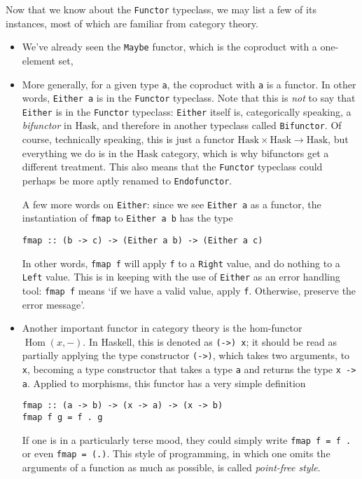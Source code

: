 \documentclass[11	pt]{article}
\theoremstyle{nonumberplain}
\newcommand{\Hask}{\mathrm{Hask}}
\newcommand{\blank}{{-}}
\DeclareMathOperator{\Hom}{Hom}
\newcommand*\lsin{\lstinline}
\begin{document}
Now that we know about the \lsin|Functor| typeclass, we may list a few of its instances, most of which are familiar from category theory.
\begin{itemize}
\item We've already seen the \lsin|Maybe| functor, which is the coproduct with a one-element set,
\item More generally, for a given type \lsin|a|, the coproduct with \lsin|a| is a functor. In other words, \lsin|Either a| is in the \lsin|Functor| typeclass. Note that this is \emph{not} to say that \lsin|Either| is in the \lsin|Functor| typeclass: \lsin|Either| itself is, categorically speaking, a \emph{bifunctor} in $\Hask$, and therefore in another typeclass called \lsin|Bifunctor|. Of course, technically speaking, this is just a functor $\Hask \times \Hask \to \Hask$, but everything we do is in the $\Hask$ category, which is why bifunctors get a different treatment. This also means that the \lsin|Functor| typeclass could perhaps be more aptly renamed to \lsin|Endofunctor|.

A few more words on \lsin|Either|: since we see \lsin|Either a| as a functor, the instantiation of \lsin|fmap| to \lsin|Either a b| has the type
\begin{lstlisting}
fmap :: (b -> c) -> (Either a b) -> (Either a c)
\end{lstlisting}

In other words, \lsin|fmap f| will apply \lsin|f| to a \lsin|Right| value, and do nothing to a \lsin|Left| value. This is in keeping with the use of \lsin|Either| as an error handling tool: \lsin|fmap f| means `if we have a valid value, apply \lsin|f|. Otherwise, preserve the error message'.

\item Another important functor in category theory is the hom-functor $\Hom(x, \blank)$. In Haskell, this is denoted as \lsin|(->) x|; it should be read as partially applying the type constructor \lsin|(->)|, which takes two arguments, to \lsin|x|, becoming a type constructor that takes a type \lsin|a| and returns the type \lsin|x -> a|. Applied to morphisms, this functor has a very simple definition
\begin{lstlisting}
fmap :: (a -> b) -> (x -> a) -> (x -> b)
fmap f g = f . g
\end{lstlisting}

If one is in a particularly terse mood, they could simply write \lsin|fmap f = f .| or even \lsin|fmap = (.)|. This style of programming, in which one omits the arguments of a function as much as possible, is called \emph{point-free style}.


\end{itemize}
\end{document}
